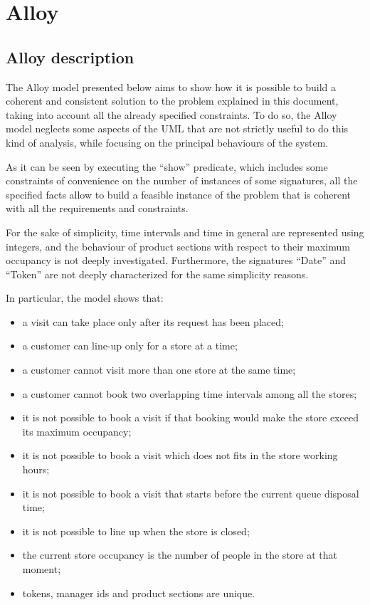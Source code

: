 \documentclass[a4paper,oneside,11pt]{book}   %
\begin{document}
\chapter{Alloy}
    \section{Alloy description}
    The Alloy model presented below aims to show how it is possible to build a coherent and consistent solution to the problem explained in this document, taking into account all the already specified constraints. To do so, the Alloy model neglects some aspects of the UML that are not strictly useful to do this kind of analysis, while focusing on the principal behaviours of the system. \par
    As it can be seen by executing the “show” predicate, which includes some constraints of convenience on the number of instances of some signatures, all the specified facts allow to build a feasible instance of the problem that is coherent with all the requirements and constraints. \par
    For the sake of simplicity, time intervals and time in general are represented using integers, and the behaviour of product sections with respect to their maximum occupancy is not deeply investigated. Furthermore, the signatures “Date” and “Token” are not deeply characterized for the same simplicity reasons. \par
    In particular, the model shows that:
    \begin{itemize}
        \item a visit can take place only after its request has been placed;
        \item a customer can line-up only for a store at a time;
        \item a customer cannot visit more than one store at the same time;
        \item a customer cannot book two overlapping time intervals among all the stores;
        \item it is not possible to book a visit if that booking would make the store exceed its maximum occupancy;
        \item it is not possible to book a visit which does not fits in the store working hours;
        \item it is not possible to book a visit that starts before the current queue disposal time;
        \item it is not possible to line up when the store is closed;
        \item the current store occupancy is the number of people in the store at that moment;
        \item tokens, manager ids and product sections are unique.
    \end{itemize}
\end{document}

